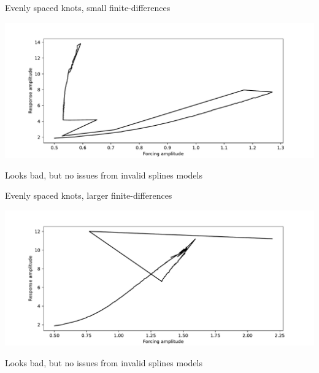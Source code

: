 \documentclass[presentation]{beamer}
\begin{document}
\begin{frame}[label={sec:org51e44e0}]{Evenly spaced knots, small finite-differences}
\begin{center}
\includegraphics[width=.9\linewidth]{./spline_fail.pdf}
\end{center}

Looks bad, but no issues from invalid splines models
\end{frame}

\begin{frame}[label={sec:orgfe7fbb1}]{Evenly spaced knots, larger finite-differences}
\begin{center}
\includegraphics[width=.9\linewidth]{./spline_fail_larger_finite_differences.pdf}
\end{center}

Looks bad, but no issues from invalid splines models
\end{frame}
\end{document}

